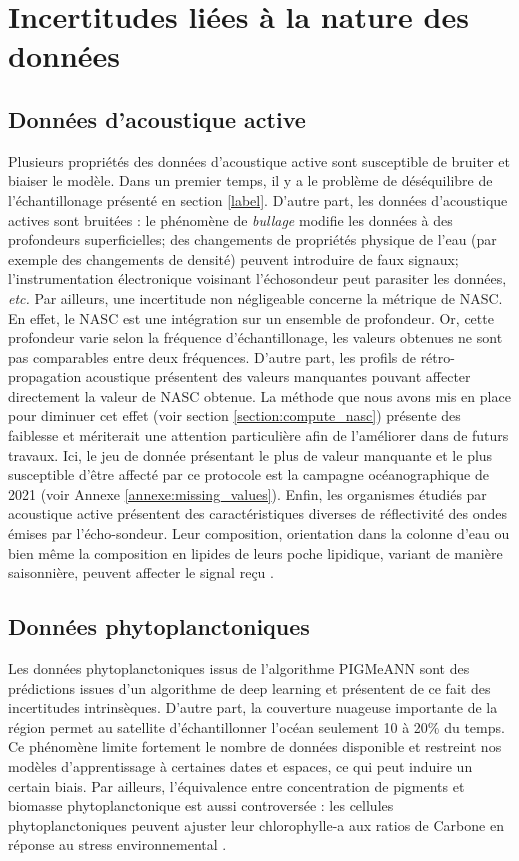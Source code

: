\section{Incertitudes liées à la nature des données}	
\subsection{Données d'acoustique active}
Plusieurs propriétés des données d'acoustique active sont susceptible de bruiter et biaiser le modèle. Dans un premier temps, il y a le problème de déséquilibre de l'échantillonage présenté en section \ref{label}. D'autre part, les données d'acoustique actives sont bruitées : le phénomène de \textit{bullage} modifie les données à des profondeurs superficielles; des changements de propriétés physique de l'eau (par exemple des changements de densité) peuvent introduire de faux signaux; l'instrumentation électronique voisinant l'échosondeur peut parasiter les données, \textit{etc.}
Par ailleurs, une incertitude non négligeable concerne la métrique de NASC. En effet, le NASC est une intégration sur un ensemble de profondeur. Or, cette profondeur varie selon la fréquence d'échantillonage, les valeurs obtenues ne sont pas comparables entre deux fréquences. D'autre part, les profils de rétro-propagation acoustique présentent des valeurs manquantes pouvant affecter directement la valeur de NASC obtenue. La méthode que nous avons mis en place pour diminuer cet effet (voir section \ref{section:compute_nasc}) présente des faiblesse et mériterait une attention particulière afin de l'améliorer dans de futurs travaux. Ici, le jeu de donnée présentant le plus de valeur manquante et le plus susceptible d'être affecté par ce protocole est la campagne océanographique de 2021 (voir Annexe \ref{annexe:missing_values}).
Enfin, les organismes étudiés par acoustique active présentent des caractéristiques diverses de réflectivité des ondes émises par l'écho-sondeur. Leur composition, orientation dans la colonne d'eau ou bien même la composition en lipides de leurs poche lipidique, variant de manière saisonnière, peuvent affecter le signal reçu \cite{benoitbird2016ecological}. 

\subsection{Données phytoplanctoniques}
Les données phytoplanctoniques issus de l'algorithme PIGMeANN sont des prédictions issues d'un algorithme de deep learning et présentent de ce fait des incertitudes intrinsèques. D'autre part, la couverture nuageuse importante de la région permet au satellite d'échantillonner l'océan seulement 10 à 20\% du temps. Ce phénomène limite fortement le nombre de données disponible et restreint nos modèles d'apprentissage à certaines dates et espaces, ce qui peut induire un certain biais. 
Par ailleurs, l'équivalence entre concentration de pigments et biomasse phytoplanctonique est aussi controversée : les cellules phytoplanctoniques peuvent ajuster leur chlorophylle-a aux ratios de Carbone en réponse au stress environnemental \cite{thomalla2023Widespread}. 

